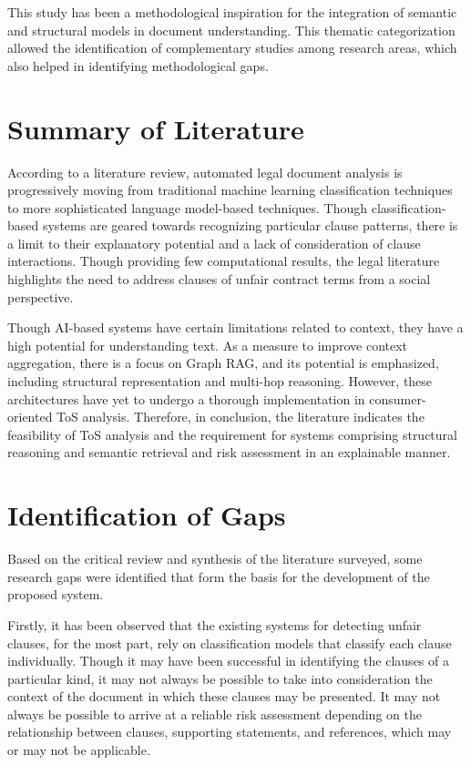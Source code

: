 This study has been a methodological inspiration
for the integration of semantic and structural models in document
understanding. This thematic categorization allowed the
identification of complementary studies among research areas, which
also helped in identifying methodological gaps.

\section{Summary of Literature}
According to a literature review, automated legal document analysis
is progressively moving from traditional machine learning
classification techniques to more sophisticated language model-based
techniques. 
Though classification-based systems are geared towards recognizing 
particular clause patterns, there is a limit to their explanatory 
potential and a lack of consideration of clause interactions.
Though providing few computational results, the legal literature 
highlights the need to address clauses of unfair contract terms from a 
social perspective.

Though AI-based systems have certain limitations related to context, 
they have a high potential for understanding text.
As a measure to improve context aggregation, there is a focus on Graph RAG, 
and its potential is emphasized, including structural representation and 
multi-hop reasoning.
However, these architectures have yet to undergo a thorough 
implementation in consumer-oriented ToS analysis.
Therefore, in conclusion, the literature indicates the feasibility of 
ToS analysis and the requirement for systems
comprising structural reasoning and semantic retrieval and risk 
assessment in an explainable manner.

\section{Identification of Gaps}
Based on the critical review and synthesis of the literature
surveyed, some research gaps were identified that form the basis for
the development of the proposed system.

Firstly, it has been observed that
the existing systems for detecting unfair clauses, for the most part, rely on classification models that classify each clause individually.
Though it may have been successful in identifying the clauses of a particular kind, it may not always be possible to take into consideration the context of the document in which these clauses may be presented.
It may not always be possible to arrive at a reliable risk assessment depending on the relationship between clauses, supporting statements, and references, which may or may not be applicable.

